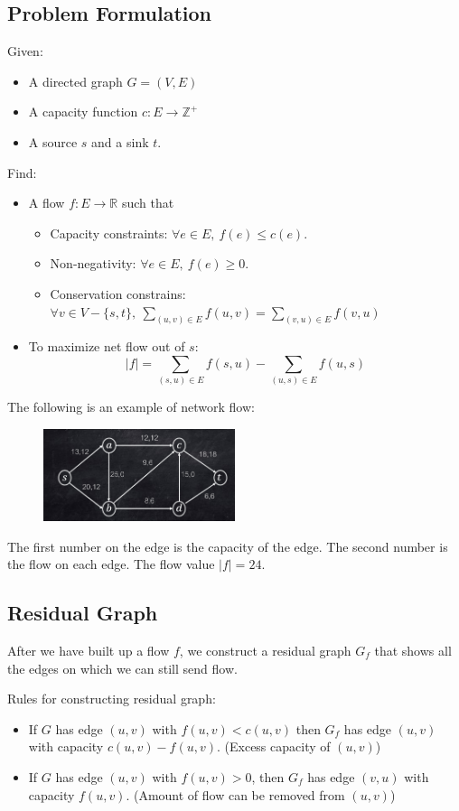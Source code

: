 \subsection{Problem Formulation}
Given:
\begin{itemize}
	\item A directed graph $G = (V, E)$
	\item A capacity function $c: E \rightarrow \mathbb{Z}^+$
	\item A source $s$ and a sink $t$.
\end{itemize}
Find:
\begin{itemize}
	\item A flow $f: E \rightarrow \mathbb{R}$ such that
		\begin{itemize}
			\item Capacity constraints: $\forall e \in E, ~f(e) \le c(e)$.
			\item Non-negativity: $\forall e \in E, ~f(e) \ge 0$.
			\item Conservation constrains: $\forall v \in V - \{s, t\}, ~\sum_{(u,v) \in E} f(u,v) = \sum_{(v, u) \in E}f(v,u)$
		\end{itemize}
	\item To maximize net flow out of $s$:
	\[|f| = \sum_{(s,u) \in E} f(s, u) - \sum_{(u,s) \in E} f(u,s)\]
\end{itemize}
The following is an example of network flow:
\begin{figure}[H]
	\centering
	\includegraphics[width=0.5\textwidth]{fig/flow.png}
\end{figure}
The first number on the edge is the capacity of the edge. The second number is the flow on each edge. The flow value $|f| = 24$.

\subsection{Residual Graph}
After we have built up a flow $f$, we construct a residual graph $G_f$ that shows all the edges on which we can still send flow.

Rules for constructing residual graph:
\begin{itemize}
	\item If $G$ has edge $(u, v)$ with $f(u, v) < c(u, v)$ then $G_f$ has edge $(u, v)$ with capacity $c(u, v) - f(u, v)$. (Excess capacity of $(u,v)$)
	\item If $G$ has edge $(u, v)$ with $f(u, v) > 0$, then $G_f$ has edge $(v, u)$ with capacity $f(u, v)$. (Amount of flow can be removed from $(u,v)$)
\end{itemize}

